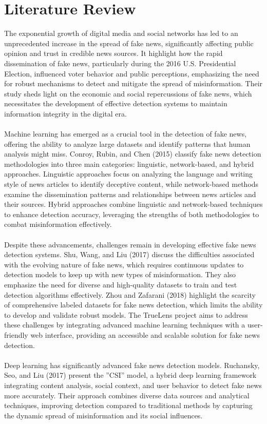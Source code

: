 \section{Literature Review}
The exponential growth of digital media and social networks has led to an unprecedented increase in the spread of fake news, significantly affecting public opinion and trust in credible news sources. It highlight how the rapid dissemination of fake news, particularly during the 2016 U.S. Presidential Election, influenced voter behavior and public perceptions, emphasizing the need for robust mechanisms to detect and mitigate the spread of misinformation. Their study sheds light on the economic and social repercussions of fake news, which necessitates the development of effective detection systems to maintain information integrity in the digital era.\cite{allcott2017social}\\\\
Machine learning has emerged as a crucial tool in the detection of fake news, offering the ability to analyze large datasets and identify patterns that human analysis might miss. Conroy, Rubin, and Chen (2015) classify fake news detection methodologies into three main categories: linguistic, network-based, and hybrid approaches. Linguistic approaches focus on analyzing the language and writing style of news articles to identify deceptive content, while network-based methods examine the dissemination patterns and relationships between news articles and their sources. Hybrid approaches combine linguistic and network-based techniques to enhance detection accuracy, leveraging the strengths of both methodologies to combat misinformation effectively.\cite{conroy2015automatic}\\\\
Despite these advancements, challenges remain in developing effective fake news detection systems. Shu, Wang, and Liu (2017) discuss the difficulties associated with the evolving nature of fake news, which requires continuous updates to detection models to keep up with new types of misinformation. They also emphasize the need for diverse and high-quality datasets to train and test detection algorithms effectively. Zhou and Zafarani (2018) highlight the scarcity of comprehensive labeled datasets for fake news detection, which limits the ability to develop and validate robust models. The TrueLens project aims to address these challenges by integrating advanced machine learning techniques with a user-friendly web interface, providing an accessible and scalable solution for fake news detection.\cite{zhou2018survey}\\\\
Deep learning has significantly advanced fake news detection models. Ruchansky, Seo, and Liu (2017) present the ”CSI” model, a hybrid deep learning framework integrating content analysis, social context, and user behavior to detect fake news more accurately. Their approach combines diverse data sources and analytical techniques, improving detection compared to traditional methods by capturing the dynamic spread of misinformation and its social influences.\cite{ruchansky2017csi}